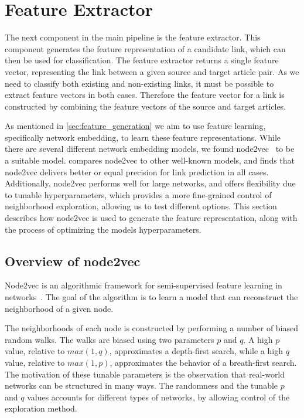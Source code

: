 \section{Feature Extractor}\label{feature_extractor}
The next component in the main pipeline is the feature extractor. This component generates the feature representation of a candidate link, which can then be used for classification. The feature extractor returns a single feature vector, representing the link between a given source and target article pair. As we need to classify both existing and non-existing links, it must be possible to extract feature vectors in both cases. Therefore the feature vector for a link is constructed by combining the feature vectors of the source and target articles.

As mentioned in \cref{sec:feature_generation} we aim to use feature learning, specifically network embedding, to learn these feature representations. While there are several different network embedding models, we found node2vec~\cite{node2vec} to be a suitable model. \cite{node2vec} compares node2vec to other well-known models, and finds that node2vec delivers better or equal precision for link prediction in all cases.  Additionally, node2vec performs well for large networks, and offers flexibility due to tunable hyperparameters, which provides a more fine-grained control of neighborhood exploration, allowing us to test different options. This section describes how node2vec is used to generate the feature representation, along with the process of optimizing the models hyperparameters.

\subsection{Overview of node2vec} %
\label{sec:node2vec}
Node2vec is an algorithmic framework for semi-supervised feature learning in networks~\cite{node2vec}. The goal of the algorithm is to learn a model that can reconstruct the neighborhood of a given node.

The neighborhoods of each node is constructed by performing a number of biased random walks. The walks are biased using two parameters $p$ and $q$. A high $p$ value, relative to $max(1,q)$, approximates a depth-first search, while a high $q$ value, relative to $max(1,p)$, approximates the behavior of a breath-first search. The motivation of these tunable parameters is the observation that real-world networks can be structured in many ways. The randomness and the tunable $p$ and $q$ values accounts for different types of networks, by allowing control of the exploration method.

